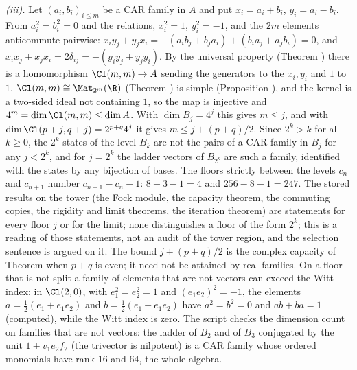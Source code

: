 \emph{(iii).} Let $(a_{i}, b_{i})_{i \le m}$ be a CAR family in $A$ and put $x_{i} = a_{i} + b_{i}$, $y_{i} = a_{i} - b_{i}$. From $a_{i}^{2} = b_{i}^{2} = 0$ and the relations, $x_{i}^{2} = 1$, $y_{i}^{2} = -1$, and the $2m$ elements anticommute pairwise: $x_{i}y_{j} + y_{j}x_{i} = -(a_{i}b_{j} + b_{j}a_{i}) + (b_{i}a_{j} + a_{j}b_{i}) = 0$, and $x_{i}x_{j} + x_{j}x_{i} = 2\delta_{ij} = -(y_{i}y_{j} + y_{j}y_{i})$. By the universal property (Theorem ) there is a homomorphism $\Cl(m,m) \to A$ sending the generators to the $x_{i}, y_{i}$ and $1$ to $1$. $\Cl(m,m) \cong \Mat_{2^{m}}(\R)$ (Theorem ) is simple (Proposition ), and the kernel is a two-sided ideal not containing $1$, so the map is injective and $4^{m} = \dim\Cl(m,m) \le \dim A$. With $\dim B_{j} = 4^{j}$ this gives $m \le j$, and with $\dim\Cl(p + j, q + j) = 2^{p+q}4^{j}$ it gives $m \le j + (p+q)/2$. Since $2^{k} > k$ for all $k \ge 0$, the $2^{k}$ states of the level $B_{k}$ are not the pairs of a CAR family in $B_{j}$ for any $j < 2^{k}$, and for $j = 2^{k}$ the ladder vectors of $B_{2^{k}}$ are such a family, identified with the states by any bijection of bases. The floors strictly between the levels $c_{n}$ and $c_{n+1}$ number $c_{n+1} - c_{n} - 1$: $8 - 3 - 1 = 4$ and $256 - 8 - 1 = 247$. The stored results on the tower (the Fock module, the capacity theorem, the commuting copies, the rigidity and limit theorems, the iteration theorem) are statements for every floor $j$ or for the limit; none distinguishes a floor of the form $2^{k}$; this is a reading of those statements, not an audit of the tower region, and the selection sentence is argued on it. The bound $j + (p+q)/2$ is the complex capacity of Theorem  when $p + q$ is even; it need not be attained by real families. On a floor that is not split a family of elements that are not vectors can exceed the Witt index: in $\Cl(2,0)$, with $e_{1}^{2} = e_{2}^{2} = 1$ and $(e_{1}e_{2})^{2} = -1$, the elements $a = \tfrac12(e_{1} + e_{1}e_{2})$ and $b = \tfrac12(e_{1} - e_{1}e_{2})$ have $a^{2} = b^{2} = 0$ and $ab + ba = 1$ (computed), while the Witt index is zero. The script checks the dimension count on families that are not vectors: the ladder of $B_{2}$ and of $B_{3}$ conjugated by the unit $1 + v_{1}e_{2}f_{2}$ (the trivector is nilpotent) is a CAR family whose ordered monomials have rank $16$ and $64$, the whole algebra.

